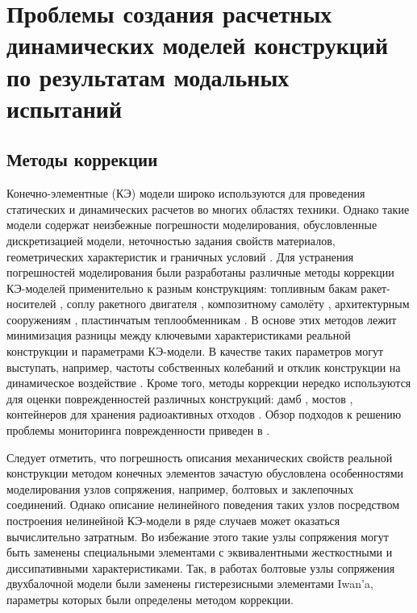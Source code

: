 \chapter{Проблемы создания расчетных динамических моделей конструкций по результатам модальных испытаний}

\section{Методы коррекции} 

Конечно-элементные (КЭ) модели широко используются для проведения статических и динамических расчетов во многих областях техники. Однако такие модели содержат неизбежные погрешности моделирования, обусловленные дискретизацией модели, неточностью задания свойств материалов, геометрических характеристик и граничных условий \cite{lib:modelUpdating:Bartilson}. Для устранения погрешностей моделирования были разработаны различные методы коррекции КЭ-моделей применительно к разным конструкциям: топливным бакам ракет-носителей \cite{lib:modelUpdating:Li&Tian}, соплу ракетного двигателя \cite{lib:modelUpdating:Yan&Li}, композитному самолёту \cite{lib:modelUpdating:Zhao&Gupta}, архитектурным сооружениям \cite{lib:modelUpdating:Girardi&Padovani}, пластинчатым теплообменникам \cite{lib:modelUpdating:Guo&Wang}. В основе этих методов лежит минимизация разницы между ключевыми характеристиками реальной конструкции и параметрами КЭ-модели. В качестве таких параметров могут выступать, например, частоты собственных колебаний и отклик конструкции на динамическое воздействие \cite{lib:modelUpdating:Petersen&Oiseth}. Кроме того, методы коррекции нередко используются для оценки поврежденностей различных конструкций: дамб \cite{lib:modelUpdating:Bayraktar&Sevim}, мостов \cite{lib:modelUpdating:Cong&Thoi, lib:modelUpdating:Polanco}, контейнеров для хранения радиоактивных отходов \cite{lib:modelUpdating:Eiras}. Обзор подходов к решению проблемы мониторинга поврежденности приведен в \cite{lib:modelUpdating:Simoen}. 

Следует отметить, что погрешность описания механических свойств реальной конструкции методом конечных элементов зачастую обусловлена особенностями моделирования узлов сопряжения, например, болтовых и заклепочных соединений. Однако описание нелинейного поведения таких узлов посредством построения нелинейной КЭ-модели в ряде случаев может оказаться вычислительно затратным. Во избежание этого такие узлы сопряжения могут быть заменены специальными элементами с эквивалентными жесткостными и диссипативными характеристиками. Так, в работах \cite{lib:modelUpdating:Lacayo, lib:modelUpdating:Yuan} болтовые узлы сопряжения двухбалочной модели были заменены гистерезисными элементами Iwan’a, параметры которых были определены методом коррекции. 

